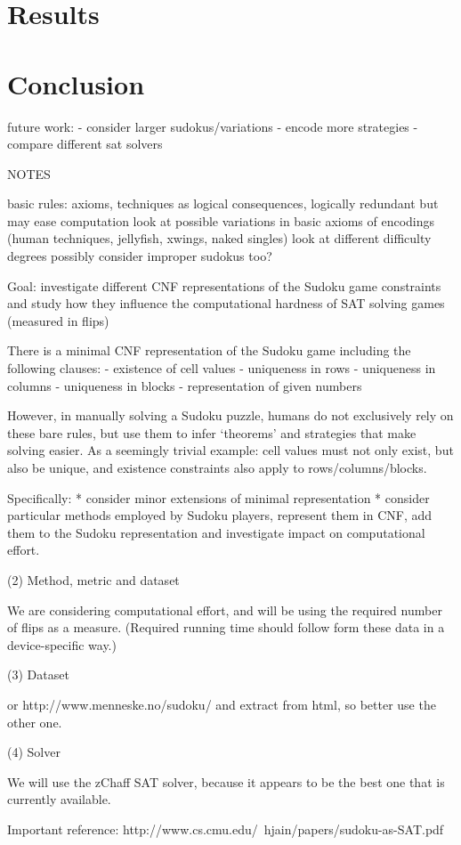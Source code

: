 \documentclass[10pt,a4paper,leqno]{article}
\begin{document}
\section*{Results}

\section*{Conclusion}

future work:
- consider larger sudokus/variations
- encode more strategies
- compare different sat solvers




NOTES

basic rules: axioms, techniques as logical consequences, logically redundant but may ease computation
	look at possible variations in basic axioms of
encodings (human techniques, jellyfish, xwings, naked singles)
look at different difficulty degrees
possibly consider improper sudokus too?

Goal: investigate different CNF representations of the Sudoku game constraints and study how they influence the computational hardness of SAT solving games (measured in flips)

There is a minimal CNF representation of the Sudoku game including the following clauses:
- existence of cell values
- uniqueness in rows
- uniqueness in columns
- uniqueness in blocks
- representation of given numbers

However, in manually solving a Sudoku puzzle, humans do not exclusively rely on these bare rules, but use them to infer ‘theorems’ and strategies that make solving easier.  As a seemingly trivial example: cell values must not only exist, but also be unique, and existence constraints also apply to rows/columns/blocks.

Specifically: 
* consider minor extensions of minimal representation 
* consider particular methods employed by Sudoku players, represent them in CNF, add them to the Sudoku representation and investigate impact on computational effort. 

(2) Method, metric and dataset

We are considering computational effort, and will be using the required number of flips as a measure. (Required running time should follow form these data in a device-specific way.)

(3) Dataset


or
http://www.menneske.no/sudoku/
and extract from html, so better use the other one. 

(4) Solver

We will use the zChaff SAT solver, because it appears to be the best one that is currently available. 

Important reference:
http://www.cs.cmu.edu/~hjain/papers/sudoku-as-SAT.pdf
\end{document}
